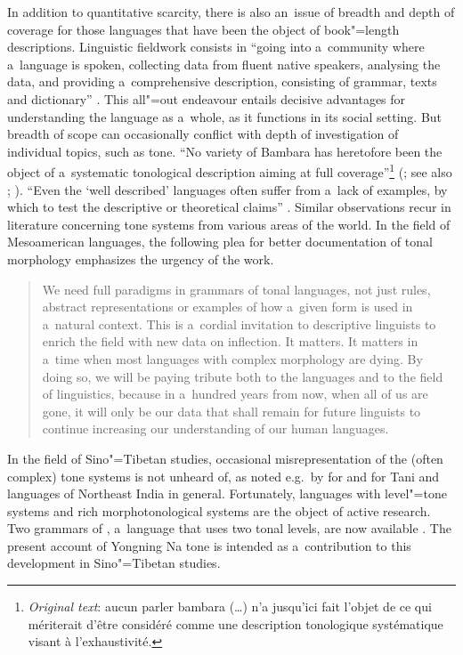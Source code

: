 In addition to quantitative scarcity, there is also an~issue of breadth and depth of coverage for
those languages that have been the object of book"=length descriptions. Linguistic fieldwork consists in “going into a~community
where a~language is spoken, collecting data from fluent native speakers, analysing the data, and
providing a~comprehensive description, consisting of grammar, texts and dictionary”
\citep[12]{Dixon2007}. This all"=out endeavour entails decisive advantages for understanding the language as a~whole, as it functions in its social setting. But breadth of scope can occasionally conflict with depth of investigation of individual topics, such as tone. “No variety of Bambara has heretofore been the object of a~systematic tonological
description aiming at full coverage”\footnote{\textit{Original text}: aucun parler bambara ({\dots}) n’a jusqu’ici fait
	l’objet de ce qui mériterait d’être considéré comme une description tonologique systématique visant
	à l’exhaustivité.} (\citealt[199]{creissels1992}; see also \citealt{clements2000};
\citealt{hyman2005a}). “Even the ‘well described’ languages often suffer from a~lack of examples, by which to test the descriptive or theoretical
claims” \citep[xxiii]{nurse2011}. Similar observations recur in literature concerning tone systems from various areas of the world. In the field of Mesoamerican languages, the following plea for better documentation of tonal morphology emphasizes the urgency of the work.

\begin{quotation}
	We need full paradigms in grammars of tonal languages, not just rules, abstract representations or examples of how a~given form is used in a~natural context. This is a~cordial invitation to descriptive linguists
	to enrich the field with new data on inflection. It matters. It matters in a~time
	when most languages with complex morphology are dying. By doing so, we will
	be paying tribute both to the languages and to the field of linguistics, because in
	a~hundred years from now, when all of us are gone, it will only be our data that
	shall remain for future linguists to continue increasing our understanding of our
	human languages. \citep[134]{palancar2016}
\end{quotation}

In the field of Sino"=Tibetan studies, occasional misrepresentation of the (often complex) tone systems is not unheard of, as noted e.g.~by \citet{sun2003b} for  and \citet[188]{post2015} for Tani and languages of Northeast India in general. Fortunately, languages
with level"=tone systems and rich morphotonological systems are the object of active research. Two grammars of
, a~language that uses two tonal levels, are now available \citep{daudey2014,ding2014}. The present account
of Yongning Na tone is intended as a~contribution to this development in Sino"=Tibetan studies. 

